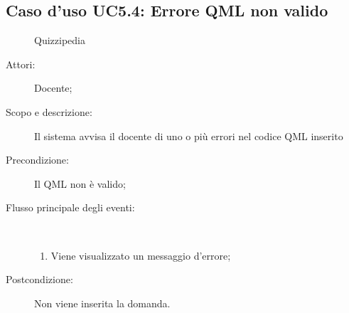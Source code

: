 \subsection{Caso d'uso UC5.4: Errore QML non valido}
	\begin{figure}[H]
		\centering
		\begin{resizedtikzpicture}{\textwidth}
		\begin{umlsystem}[x=0, fill=lightgray!20]{Quizzipedia}
		\end{umlsystem}
		\end{resizedtikzpicture}
		\caption{}
	\end{figure}
\begin{description}
\item[Attori:] Docente;
\item[Scopo e descrizione:] Il sistema avvisa il docente di uno o più errori nel codice QML inserito
      \item[Precondizione:] Il QML non è valido;

        \item[Flusso principale degli eventi:] \ 
 \begin{enumerate}
          \item Viene visualizzato un messaggio d'errore;

      \end{enumerate}
    \item[Postcondizione:] Non viene inserita la domanda.
  \end{description}
\hypertarget{UC5.5}{}
